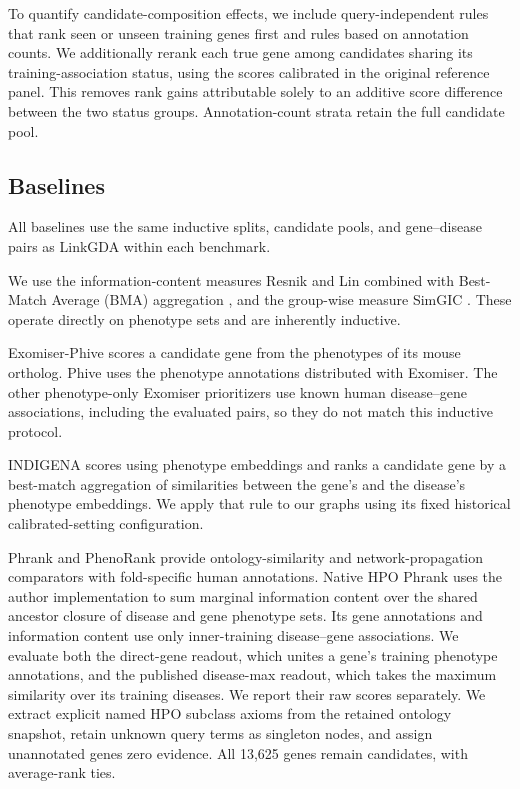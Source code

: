 \documentclass[webpdf,contemporary,large]{oup-authoring-template}%
\theoremstyle{thmstyleone}%
\theoremstyle{thmstyletwo}%
\theoremstyle{thmstylethree}%
\newcommand{\method}{LinkGDA}
\renewcommand{\cite}{\citep}
\begin{document}
To quantify candidate-composition effects, we include query-independent rules
that rank seen or unseen training genes first and rules based on annotation
counts. We additionally rerank each true gene among candidates sharing its
training-association status, using the scores calibrated in the original
reference panel. This removes rank gains attributable solely to an additive
score difference between the two status groups. Annotation-count strata retain
the full candidate pool.

\subsection{Baselines}
\label{sec:baselines}

All baselines use the same inductive splits, candidate pools, and
gene--disease pairs as \method{} within each benchmark.

We use the information-content measures Resnik
\cite{resnik1995using} and Lin \cite{linsemsim} combined with Best-Match
Average (BMA) aggregation
\cite{pesquita2009semantic}, and the group-wise measure SimGIC
\cite{pesquita2007evaluating}. These
operate directly on phenotype sets and are inherently inductive.

Exomiser-Phive \cite{robinson2014improved} scores a
candidate gene from the phenotypes of its mouse ortholog. Phive uses the
phenotype annotations distributed with Exomiser. The other
phenotype-only Exomiser prioritizers use known human disease--gene
associations, including the evaluated pairs, so they do not match this
inductive protocol.

INDIGENA \cite{indigena} scores using phenotype embeddings
and ranks a candidate gene by a best-match aggregation of
similarities between the gene's and the disease's phenotype
embeddings. We apply that rule to our graphs using its fixed historical calibrated-setting configuration.

Phrank \cite{jagadeesh2019phrank} and PhenoRank
\cite{cornish2018phenorank} provide ontology-similarity and network-propagation
comparators with fold-specific human annotations. Native HPO Phrank uses the
author implementation to sum marginal information content over the shared
ancestor closure of disease and gene phenotype sets. Its gene annotations and
information content use only inner-training disease--gene associations. We
evaluate both the direct-gene readout, which unites a gene's training phenotype
annotations, and the published disease-max readout, which takes the maximum
similarity over its training diseases. We report their raw scores separately.
We extract explicit named HPO subclass axioms from the retained ontology snapshot,
retain unknown query terms as singleton nodes, and assign unannotated genes
zero evidence. All 13{,}625 genes remain candidates, with average-rank ties.
\end{document}
